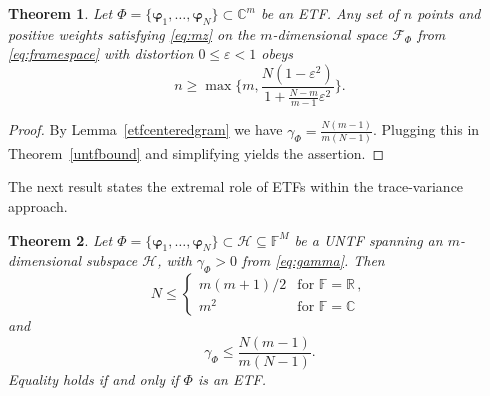 \documentclass[a4paper]{amsart}
\numberwithin{equation}{section}
\newtheorem{theorem}{Theorem}[section]
\begin{document}
\begin{theorem}\label{etfbound}
    Let $\Phi=\{\bm\varphi_1,\dots,\bm\varphi_N\}\subset\mathds C^m$ be an ETF.
    Any set of $n$ points and positive weights satisfying \eqref{eq:mz} on the $m$-dimensional space $\mathcal F_{\Phi}$ from \eqref{eq:framespace} with distortion $0\le \varepsilon<1$ obeys
    \begin{equation*}
        n\ge
        \max\Big\{
        m,
        \frac{N(1-\varepsilon^2)}
             {1+\frac{N-m}{m-1}\varepsilon^2}
        \Big\}.
    \end{equation*}
\end{theorem}

\begin{proof}
    By Lemma~\ref{etfcenteredgram} we have $\gamma_\Phi = \frac{N(m-1)}{m(N-1)}$.
    Plugging this in Theorem~\ref{untfbound} and simplifying yields the assertion.
\end{proof}

The next result states the extremal role of ETFs within the trace-variance approach.

\begin{theorem}\label{simplexextremality}
    Let $\Phi = \{\bm\varphi_1,\dots,\bm\varphi_N\}\subset\mathcal H\subseteq\mathds F^M$ be a UNTF spanning an $m$-dimensional subspace $\mathcal H$, with $\gamma_\Phi>0$ from \eqref{eq:gamma}.
    Then
    \begin{equation*}
        N\le \begin{cases}m(m+1)/2 & \text{for }\mathds F=\mathds R\,,\\ m^2&\text{for }\mathds F=\mathds C\end{cases}
    \end{equation*}
    and
    \begin{equation*}
        \gamma_\Phi
        \le \frac{N(m-1)}{m(N-1)}.
    \end{equation*}
    Equality holds if and only if $\Phi$ is an ETF.
\end{theorem}
\end{document}
